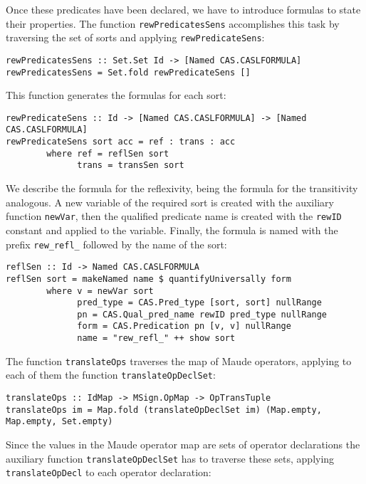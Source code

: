 Once these predicates have been declared, we have to introduce
formulas to state their properties. The function \verb"rewPredicatesSens"
accomplishes this task by traversing the set of sorts and applying
\verb"rewPredicateSens":

{\codesize
\begin{verbatim}
rewPredicatesSens :: Set.Set Id -> [Named CAS.CASLFORMULA]
rewPredicatesSens = Set.fold rewPredicateSens []
\end{verbatim}
}

This function generates the formulas for each sort:

{\codesize
\begin{verbatim}
rewPredicateSens :: Id -> [Named CAS.CASLFORMULA] -> [Named CAS.CASLFORMULA]
rewPredicateSens sort acc = ref : trans : acc
        where ref = reflSen sort
              trans = transSen sort
\end{verbatim}
}

We describe the formula for the reflexivity, being the formula for the
transitivity analogous. A new variable of the required sort is created with
the auxiliary function \verb"newVar", then the qualified predicate
name is created with the \verb"rewID" constant and applied to the
variable. Finally, the formula is named with the prefix \verb"rew_refl_"
followed by the name of the sort:

{\codesize
\begin{verbatim}
reflSen :: Id -> Named CAS.CASLFORMULA
reflSen sort = makeNamed name $ quantifyUniversally form
        where v = newVar sort
              pred_type = CAS.Pred_type [sort, sort] nullRange
              pn = CAS.Qual_pred_name rewID pred_type nullRange
              form = CAS.Predication pn [v, v] nullRange
              name = "rew_refl_" ++ show sort
\end{verbatim}
}

The function \verb"translateOps" traverses the map of Maude operators,
applying to each of them the function \verb"translateOpDeclSet":

{\codesize
\begin{verbatim}
translateOps :: IdMap -> MSign.OpMap -> OpTransTuple
translateOps im = Map.fold (translateOpDeclSet im) (Map.empty, Map.empty, Set.empty)
\end{verbatim}
}

Since the values in the Maude operator map are sets of operator declarations
the auxiliary function \verb"translateOpDeclSet" has to traverse these sets, applying
\verb"translateOpDecl" to each operator declaration:

